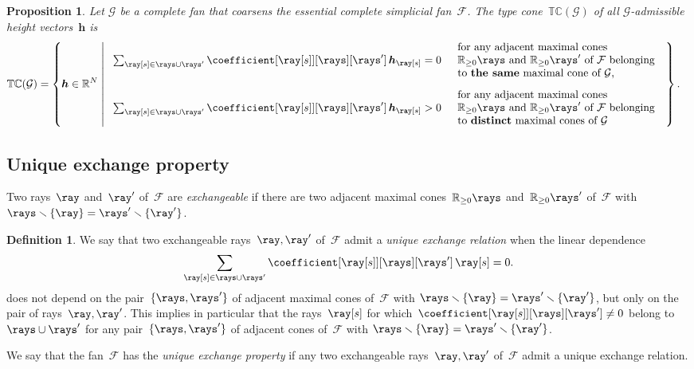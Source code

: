 \documentclass{amsart}
\newtheorem{proposition}[theorem]{Proposition}
\theoremstyle{definition}
\newtheorem{definition}[theorem]{Definition}
\newcommand{\R}{\mathbb{R}} %
\renewcommand{\c}[1]{{\mathcal{#1}}} %
\renewcommand{\b}[1]{{\boldsymbol{#1}}} %
\newcommand{\ssm}{\smallsetminus} %
\newcommand{\darkblue}{\color{darkblue}} %
\newcommand{\defn}[1]{\textsl{\darkblue #1}} %
\newcommand{\Fan}{\mathcal{F}} %
\newcommand{\typeCone}{\mathbb{TC}} %
\begin{document}
\begin{proposition}
\label{prop:non-simplicial}
Let $\c{G}$ be a complete fan that coarsens the essential complete simplicial fan~$\Fan$.
The \defn{type cone}~$\typeCone(\c{G})$ of all $\c{G}$-admissible height vectors~$\b{h}$ is
\begin{align*}
\typeCone(\c{G}) 
& = \left\{\b{h} \in \R^N\;\middle|\;
\begin{array}{ll}
\sum_{\ray[s] \in \rays \cup \rays'} \coefficient[{\ray[s]}][\rays][\rays'] \, \b{h}_{\ray[s]} = 0
& \begin{array}{l} \text{for any adjacent maximal cones} \\ \text{$\R_{\ge0}\rays$ and~$\R_{\ge0}\rays'$ of~$\Fan$ belonging}\\\text{to \textbf{the same} maximal cone of $\c{G}$,}\end{array}
\\[.7cm]
\sum_{\ray[s] \in \rays \cup \rays'} \coefficient[{\ray[s]}][\rays][\rays'] \, \b{h}_{\ray[s]} > 0
& \begin{array}{l} \text{for any adjacent maximal cones} \\ \text{$\R_{\ge0}\rays$ and~$\R_{\ge0}\rays'$ of~$\Fan$ belonging}\\\text{to \textbf{distinct} maximal cones of $\c{G}$}\end{array}
\end{array}
\right\}.
\end{align*}
\end{proposition}


\subsection{Unique exchange property}
\label{subsec:uniqueExchangeProperty}

Two rays~$\ray$ and~$\ray'$ of~$\Fan$ are \defn{exchangeable} if there are two adjacent maximal cones~$\R_{\ge0}\rays$ and~$\R_{\ge0}\rays'$ of~$\Fan$ with ${\rays \ssm \{\ray\} = \rays' \ssm \{\ray'\}}$.

\begin{definition}
\label{def:uerp}
We say that two exchangeable rays~$\ray, \ray'$ of~$\Fan$ admit a \defn{unique exchange relation} when the linear dependence
\[
\sum_{\ray[s] \in \rays \cup \rays'} \coefficient[{\ray[s]}][\rays][\rays'] \, \ray[s] = 0.
\]
does not depend on the pair~$\{\rays, \rays'\}$ of adjacent maximal cones of~$\Fan$ with $\rays \ssm \{\ray\} = \rays' \ssm \{\ray'\}$, but only on the pair of rays~$\ray, \ray'$.
This implies in particular that the rays~$\ray[s]$ for which~$\coefficient[{\ray[s]}][\rays][\rays'] \ne 0$ belong to~$\rays \cup \rays'$ for any pair~$\{\rays, \rays'\}$ of adjacent cones of~$\Fan$ with $\rays \ssm \{\ray\} = \rays' \ssm \{\ray'\}$. 

We say that the fan~$\Fan$ has the \defn{unique exchange property} if any two exchangeable rays~$\ray, \ray'$ of~$\Fan$ admit a unique exchange relation.
\end{definition}
\end{document}
